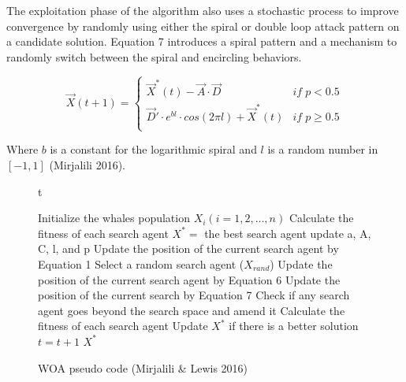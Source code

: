\documentclass[11pt]{article}
\begin{document}
{    The exploitation phase of the algorithm also uses a stochastic process to improve convergence by randomly using either the spiral or double loop attack pattern on a candidate solution.
    Equation 7 introduces a spiral pattern and a mechanism to randomly switch between the spiral and encircling behaviors.

    \begin{equation}
        \vec{X}(t+1) =
        \begin{cases}
            \vec{X}^*(t) - \vec{A}\cdot\vec{D} &if \; p < 0.5\\
            \vec{D}'\cdot e^{bl} \cdot cos(2\pi l) + \vec{X}^*(t) &if \; p \geq 0.5\\
        \end{cases}
    \end{equation}

    Where $b$ is a constant for the logarithmic spiral and $l$ is a random number in $[-1, 1]$ (Mirjalili 2016).

    \begin{figure}{t}
        \caption{WOA pseudo code (Mirjalili \& Lewis 2016)}
        \begin{algorithm}[H]
            \scriptsize
            \begin{algorithmic}[1]
                \STATE Initialize the whales population $X_i(i = 1,2, \dots, n)$
                \STATE Calculate the fitness of each search agent
                \STATE $X^* = $ the best search agent
                        \STATE update a, A, C, l, and p
                                \STATE Update the position of the current search agent by Equation 1
                            \ELSE
                                \STATE Select a random search agent ($X_{rand}$)
                                \STATE Update the position of the current search agent by Equation 6
                            \ENDIF
                        \ELSE
                            \STATE Update the position of the current search by Equation 7
                        \ENDIF
                    \ENDFOR
                    \STATE Check if any search agent goes beyond the search space and amend it
                    \STATE Calculate the fitness of each search agent
                    \STATE Update $X^*$ if there is a better solution
                    \STATE $t = t+1$
                \ENDWHILE
                \STATE \RETURN $X^*$ 
            \end{algorithmic}
        \end{algorithm}
    \end{figure}
    }
\end{document}
